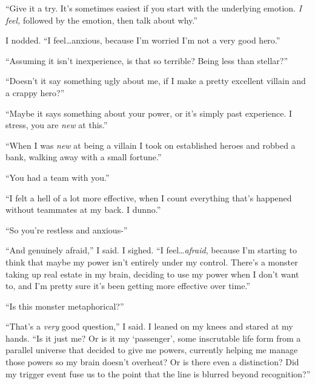 ``Give it a try.  It's sometimes easiest if you start with the underlying emotion.  \emph{I feel, }followed by the emotion, then talk about why.''



I nodded.  ``I feel\ldots anxious, because I'm worried I'm not a very good hero.''



``Assuming it isn't inexperience, is that so terrible?  Being less than stellar?''



``Doesn't it say something ugly about me, if I make a pretty excellent villain and a crappy hero?''



``Maybe it says something about your power, or it's simply past experience.  I stress, you are \emph{new} at this.''



``When I was \emph{new} at being a villain I took on established heroes and robbed a bank, walking away with a small fortune.''



``You had a team with you.''



``I felt a hell of a lot more effective, when I count everything that's happened without teammates at my back.  I dunno.''



``So you're restless and anxious-''



``And genuinely afraid,'' I said.  I sighed.  ``I feel\ldots \emph{afraid}, because I'm starting to think that maybe my power isn't entirely under my control.  There's a monster taking up real estate in my brain, deciding to use my power when I don't want to, and I'm pretty sure it's been getting more effective over time.''



``Is this monster metaphorical?''



``That's a \emph{very} good question,'' I said.  I leaned on my knees and stared at my hands.  ``Is it just me?  Or is it my `passenger', some inscrutable life form from a parallel universe that decided to give me powers, currently helping me manage those powers so my brain doesn't overheat?  Or is there even a distinction?  Did my trigger event fuse us to the point that the line is blurred beyond recognition?''




